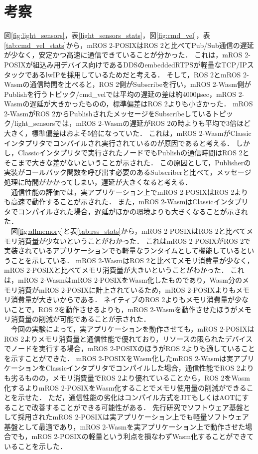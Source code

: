 \section{考察}
図\ref{fig:light_sensors}，表\ref{light_sensors_stats}，図\ref{fig:cmd_vel}，表\ref{tab:cmd_vel_stats}から，mROS 2-POSIXはROS 2と比べてPub/Sub通信の遅延が少なく，安定かつ高速に通信できていることが分かった．
これは，mROS 2-POSIXが組込み用デバイス向けであるDDSのembeddedRTPSが軽量なTCP/IPスタックであるlwIPを採用しているためだと考える．
そして，ROS 2とmROS 2-Wasmの通信時間を比べると，ROS 2側がSubscribeを行い，mROS 2-Wasm側がPublishを行うトピック/cmd\_velでは平均の遅延の差は約4000μsec，mROS 2-Wasmの遅延が大きかったものの，標準偏差はROS 2よりも小さかった．
mROS 2-WasmがROS 2からPublishされたメッセージをSubscribeしているトピック/light\_sensorsでは，mROS 2-Wasmの遅延がROS 2の時よりも平均で3倍ほど大きく，標準偏差はおよそ5倍になっていた．
これは，mROS 2-WasmがClassicインタプリタでコンパイルされ実行されているのが原因であると考える．
しかし，Classicインタプリタで実行されたノードでもPublishの通信時間はROS 2とそこまで大きな差がないということが示された．
この原因として，Publisherの実装がコールバック関数を呼び出す必要のあるSubscriberと比べて，メッセージ処理に時間がかかってしまい，遅延が大きくなると考える．
\\　通信性能の評価では，実アプリケーション上でmROS 2-POSIXはROS 2よりも高速で動作することが示された．
また，mROS 2-WasmはClassicインタプリタでコンパイルされた場合，遅延がほかの環境よりも大きくなることが示された．
\\　図\ref{fig:allmemory}と表\ref{tab:rss_stats}から，mROS 2-POSIXはROS 2と比べてメモリ消費量が少ないということがわかった．
これはmROS 2-POSIXがROS 2で実装されているアプリケーションでも軽量なランタイムとして機能しているということを示している．
mROS 2-WasmはROS 2と比べてメモリ消費量が少なく，mROS 2-POSIXと比べてメモリ消費量が大きいということがわかった．
これは，mROS 2-WasmはmROS 2-POSIXをWasm化したものであり，Wasm分のメモリ消費がmROS 2-POSIXに計上されているため，mROS 2-POSIXよりもメモリ消費量が大きいからである．
ネイティブのROS 2よりもメモリ消費量が少ないことで，ROS 2を動作させるよりも，mROS 2-Wasmを動作させたほうがメモリ消費量の削減が可能であることが示された．
\\　今回の実験によって，実アプリケーションを動作させても，mROS 2-POSIXはROS 2よりメモリ消費量と通信性能で優れており，リソースの限られたデバイスでノードを実行する場合，mROS 2-POSIXのほうがROS 2よりも適していることを示すことができた．
mROS 2-POSIXをWasm化したmROS 2-Wasmは実アプリケーションをClassicインタプリタでコンパイルした場合，通信性能でROS 2よりも劣るものの，メモリ消費量でROS 2より優れていることから，ROS 2をWasm化するよりmROS 2-POSIXをWasm化することでメモリ使用量の削減ができることを示せた．
ただ，通信性能の劣化はコンパイル方式をJITもしくはAOTにすることで改善することができる可能性がある．
先行研究でソフトウェア基盤として採用されたmROS 2-POSIXは実アプリケーション上でも軽量ソフトウェア基盤として最適であり，mROS 2-Wasmを実アプリケーション上で動作させた場合でも，mROS 2-POSIXの軽量という利点を損なわずWasm化することができていることを示した．

